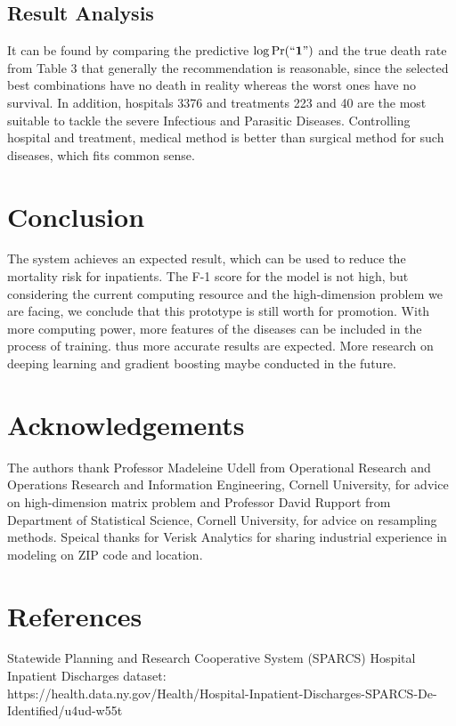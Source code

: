 \documentclass{article}
\begin{document}
\subsection{Result Analysis}
It can be found by comparing the predictive $\log \Pr(``\textbf{1}")$ and the true death rate from Table 3 that generally the recommendation is reasonable, since the selected best combinations have no death in reality whereas the worst ones have no survival. In addition, hospitals 3376 and treatments 223 and 40 are the most suitable to tackle the severe Infectious and Parasitic Diseases. Controlling hospital and treatment, medical method is better than surgical method for such diseases, which fits common sense. 

\section{Conclusion}
The system achieves an expected result, which can be used to reduce the mortality risk for inpatients. The F-1 score for the model is not high, but considering the current computing resource and the high-dimension problem we are facing, we conclude that this prototype is still worth for promotion. With more computing power, more features of the diseases can be included in the process of training. thus more accurate results are expected. More research on deeping learning and gradient boosting maybe conducted in the future. 

\section{Acknowledgements}
The authors thank Professor Madeleine Udell from Operational Research and Operations Research and Information Engineering, Cornell University, for advice on high-dimension matrix problem and Professor David Rupport from Department of Statistical Science, Cornell University, for advice on resampling methods. Speical thanks for Verisk Analytics for sharing industrial experience in modeling on ZIP code and location.

\section{References}
\noindent
[1] Statewide Planning and Research Cooperative System (SPARCS) Hospital Inpatient Discharges dataset: \\
{\small {https://health.data.ny.gov/Health/Hospital-Inpatient-Discharges-\do SPARCS-De-Identified/u4ud-w55t}\\}
\end{document}
